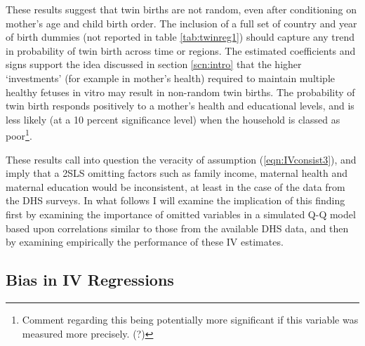 \documentclass{article}[11pt,subeqn]
\begin{document}
\begin{spacing}{1.25}
These results suggest that twin births are not random, even after conditioning on mother's age and child birth order.  The
inclusion of a full set of country and year of birth dummies (not reported in table \ref{tab:twinreg1}) should capture any trend in
probability of twin birth across time or regions.  The estimated coefficients and signs support the idea discussed in section \ref{scn:intro}
that the higher `investments' (for example in mother's health) required to maintain multiple healthy fetuses in vitro may result in 
non-random twin births.  The probability of twin birth responds positively to a mother's health and educational levels, and is less 
likely (at a 10 percent significance level) when the household is classed as poor\footnote{Comment regarding this being potentially
more significant if this variable was measured more precisely. (?)}. 

These results call into question the veracity of assumption (\ref{eqn:IVconsist3}), and imply that a 2SLS omitting factors such as family
income, maternal health and maternal education would be inconsistent, at least in the case of the data from the DHS surveys.  In what follows
I will examine the implication of this finding first by examining the importance of omitted variables in a simulated Q-Q model based upon
correlations similar to those from the available DHS data, and then by examining empirically the performance of these IV estimates.  
\subsection{Bias in IV Regressions}
\label{scn:bias}

\end{spacing}
\end{document}
